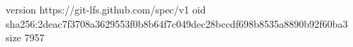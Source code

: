version https://git-lfs.github.com/spec/v1
oid sha256:2deac7f3708a3629553f0b8b64f7c049dec28bccdf698b8535a8890b92f60ba3
size 7957
